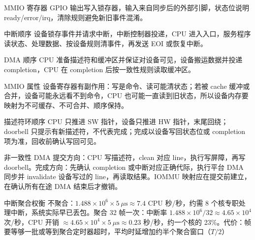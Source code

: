\begin{chapteranswer}{MMIO 寄存器}
GPIO 输出写入锁存器，输入来自同步后的外部引脚，状态位说明 ready/error/irq，清除规则避免新旧事件混淆。
\end{chapteranswer}

\begin{chapteranswer}{中断顺序}
设备锁存事件并请求中断，中断控制器投递，CPU 进入入口，服务程序读状态、处理数据、按设备规则清事件，再发送 EOI 或恢复中断。
\end{chapteranswer}

\begin{chapteranswer}{DMA 顺序}
CPU 准备描述符和缓冲区并保证对设备可见，设备搬运数据并投递 completion，CPU 在 completion 后按一致性规则读取缓冲区。
\end{chapteranswer}

\begin{chapteranswer}{MMIO 属性}
设备寄存器有副作用：写是命令、读可能清状态；若被 cache 缓冲或合并，设备可能永远看不到命令，CPU 也可能一直读到旧状态，所以设备内存要映射为不可缓存、不可合并、顺序保持。
\end{chapteranswer}

\begin{chapteranswer}{描述符环顺序}
CPU 只推进 SW 指针，设备只推进 HW 指针，末尾回绕；doorbell 只提示有新描述符，不代表完成；完成以设备写回状态位或 completion 项为准，回收前确认写回可见。
\end{chapteranswer}

\begin{chapteranswer}{非一致性 DMA}
提交方向：CPU 写描述符，clean 对应 line，执行写屏障，再写 doorbell。完成方向：先确认 completion 或中断对应正确代际，执行平台 DMA 同步并 invalidate 设备写过的 line，再读取结果。IOMMU 映射应在提交前建立，在确认所有在途 DMA 结束后才撤销。
\end{chapteranswer}

\begin{chapteranswer}{中断聚合权衡}
不聚合：$1.488\times10^{6}\times5\ \mu\text{s}\approx7.4$ CPU 秒/秒，约需 8 个核专职处理中断，系统实际早已丢包。聚合 32 帧一次：中断率 $1.488\times10^{6}/32\approx4.65\times10^{4}$ 次/秒，CPU 开销 $\approx4.65\times10^{4}\times5\ \mu\text{s}\approx0.23$ 秒/秒，约一个核的 23\%。代价：帧要等够一批或等到聚合定时器超时，平均时延增加约半个聚合窗口（$T/2$）
\end{chapteranswer}
